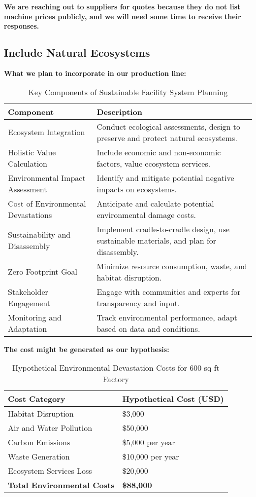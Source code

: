 \documentclass{article}
\begin{document}
\textbf{We are reaching out to suppliers for quotes because they do not list machine prices publicly, and we will need some time to receive their responses.}

\subsection{Include Natural Ecosystems}
\textbf{What we plan to incorporate in our production line:}
\begin{table}[H]
\centering
\caption{Key Components of Sustainable Facility System Planning}
\begin{tabular}{|l|p{10cm}|}
\hline
\textbf{Component} & \textbf{Description} \\
\hline
Ecosystem Integration & Conduct ecological assessments, design to preserve and protect natural ecosystems. \\
\hline
Holistic Value Calculation & Include economic and non-economic factors, value ecosystem services. \\
\hline
Environmental Impact Assessment & Identify and mitigate potential negative impacts on ecosystems. \\
\hline
Cost of Environmental Devastations & Anticipate and calculate potential environmental damage costs. \\
\hline
Sustainability and Disassembly & Implement cradle-to-cradle design, use sustainable materials, and plan for disassembly. \\
\hline
Zero Footprint Goal & Minimize resource consumption, waste, and habitat disruption. \\
\hline
Stakeholder Engagement & Engage with communities and experts for transparency and input. \\
\hline
Monitoring and Adaptation & Track environmental performance, adapt based on data and conditions. \\
\hline
\end{tabular}
\end{table}
\textbf{The cost might be generated as our hypothesis:}
\begin{table}[h]
\centering
\caption{Hypothetical Environmental Devastation Costs for 600 sq ft Factory}
\begin{tabular}{|l|l|}
\hline
\textbf{Cost Category} & \textbf{Hypothetical Cost (USD)} \\
\hline
Habitat Disruption & \$3,000 \\
\hline
Air and Water Pollution & \$50,000 \\
\hline
Carbon Emissions & \$5,000 per year \\
\hline
Waste Generation & \$10,000 per year \\
\hline
Ecosystem Services Loss & \$20,000 \\
\hline
\textbf{Total Environmental Costs} & \textbf{\$88,000} \\
\hline
\end{tabular}
\end{table}
\end{document}
